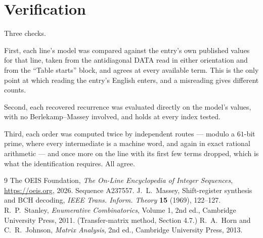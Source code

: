 \documentclass[11pt,a4paper]{article}
\theoremstyle{plain}
\theoremstyle{definition}
\begin{document}
\section{Verification}

Three checks.

First, each line's model was compared against the entry's own published values for that line,
taken from the antidiagonal DATA read in either orientation and from the ``Table starts''
block, and agrees at every available term. This is the only point at which reading the entry's
English enters, and a misreading gives different counts.

Second, each recovered recurrence was evaluated directly on the model's values, with no
Berlekamp--Massey involved, and holds at every index tested.

Third, each order was computed twice by independent routes --- modulo a $61$-bit prime, where
every intermediate is a machine word, and again in exact rational arithmetic --- and once more
on the line with its first few terms dropped, which is what the identification requires. All
agree.

\begin{thebibliography}{9}
 The OEIS Foundation, \emph{The On-Line Encyclopedia of Integer
Sequences}, \url{https://oeis.org}, 2026. Sequence A237557.
 J.~L.~Massey, Shift-register synthesis and BCH decoding, \emph{IEEE
Trans. Inform. Theory} \textbf{15} (1969), 122--127.
 R.~P.~Stanley, \emph{Enumerative Combinatorics}, Volume 1, 2nd ed.,
Cambridge University Press, 2011. (Transfer-matrix method, Section 4.7.)
 R.~A.~Horn and C.~R.~Johnson, \emph{Matrix Analysis}, 2nd ed., Cambridge
University Press, 2013.
\end{thebibliography}
\end{document}
